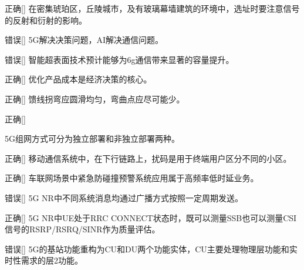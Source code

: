 \begin{choice}{\;正确\;}[]
    在密集琥珀区，丘陵城市，及有玻璃幕墙建筑的环境中，选址时要注意信号的反射和衍射的影响。
\end{choice}

\begin{choice}{\;错误\;}[]
    5G解决决策问题，AI解决通信问题。
\end{choice}

\begin{choice}{\;错误\;}[]
    智能超表面技术预计能够为6g通信带来显著的容量提升。

\end{choice}


\begin{choice}{\;正确\;}[]
    优化产品成本是经济决策的核心。

\end{choice}

\begin{choice}{\;正确\;}[]
    馈线拐弯应圆滑均匀，弯曲点应尽可能少。

\end{choice}

\begin{choice}{\;正确\;}[]

    5G组网方式可分为独立部署和非独立部署两种。
\end{choice}


\begin{choice}{\;正确\;}[]
    移动通信系统中，在下行链路上，扰码是用于终端用户区分不同的小区。

\end{choice}

\begin{choice}{\;正确\;}[]
    车联网场景中紧急防碰撞预警系统应用属于高频率低时延业务。

\end{choice}


\begin{choice}{\;错误\;}[]
    5G NR中不同系统消息均通过广播方式按照一定周期发送。

\end{choice}


\begin{choice}{\;正确\;}[]
    5G NR中UE处于RRC CONNECT状态时，既可以测量SSB也可以测量CSI信号的RSRP/RSRQ/SINR作为质量评估。

\end{choice}


\begin{choice}{\;错误\;}[]
    5G的基站功能重构为CU和DU两个功能实体，CU主要处理物理层功能和实时性需求的层2功能。

\end{choice}



